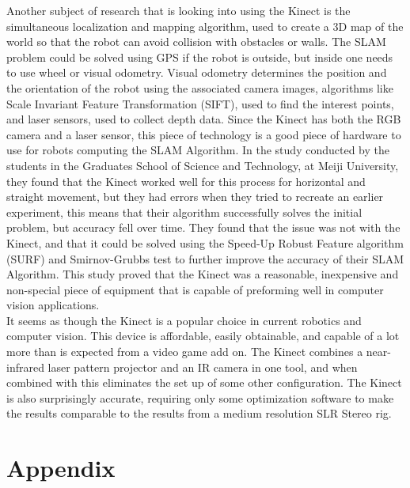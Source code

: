 \documentclass[12pt,twocolumn]{article}
\begin{document}
\indent	Another subject of research that is looking into using the Kinect is the simultaneous localization and mapping algorithm, used to create a 3D map of the world so that the robot can avoid collision with obstacles or walls. The SLAM problem could be solved using GPS if the robot is outside, but inside one needs to use wheel or visual odometry. Visual odometry determines the position and the orientation of the robot using the associated camera images, algorithms like Scale Invariant Feature Transformation (SIFT), used to find the interest points, and laser sensors, used to collect depth data. Since the Kinect has both the RGB camera and a laser sensor, this piece of technology is a good piece of hardware to use for robots computing the SLAM Algorithm. In the study conducted by the students in the Graduates School of Science and Technology, at Meiji University, they found that the Kinect worked well for this process for horizontal and straight movement, but they had errors when they tried to recreate an earlier experiment, this means that their algorithm successfully solves the initial problem, but accuracy fell over time.  \cite{cite2} They found that the issue was not with the Kinect, and that it could be solved using the Speed-Up Robust Feature algorithm (SURF) and Smirnov-Grubbs test to further improve the accuracy of their SLAM Algorithm. This study proved that the Kinect was a reasonable, inexpensive and non-special piece of equipment that is capable of preforming well in computer vision applications. \\
\indent	It seems as though the Kinect is a popular choice in current robotics and computer vision. This device is affordable, easily obtainable, and capable of a lot more than is expected from a video game add on. The Kinect combines a near-infrared laser pattern projector and an IR camera in one tool, and when combined with this eliminates the set up of some other configuration. The Kinect is also surprisingly accurate, requiring only some optimization software to make the results comparable to the results from a medium resolution SLR Stereo rig.

\section{}


\section{Appendix} 
\end{document}
